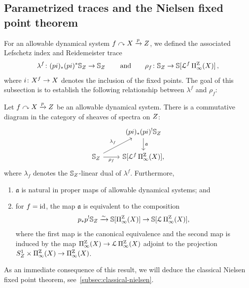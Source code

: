 \subsection{Parametrized traces and the Nielsen fixed point theorem}
For an allowable dynamical system $f\curvearrowright X\xrightarrow pZ$, we defined the associated Lefschetz index and Reidemeister trace
\begin{equation}
  \label{eq:nielsenthy-intro-characters}
  \lambda^f\colon (pi)_*(pi)^*\SS_\base\to \SS_\base\,
  \qquad\text{and}\qquad\rho_{f}\colon \SS_\base \to \SS [\cL^{f}\ani{\tset}[\base]]\,,
\end{equation}
where $i\colon X^f\to X$ denotes the inclusion of the fixed points.
The goal of this subsection is to establish the following relationship between $\lambda^f$ and $\rho_{f}$:
\begin{thm}\label{thm: lefschetz-nielsen}
  Let $f\curvearrowright X\xrightarrow pZ$ be an allowable dynamical system. There is a commutative diagram in the category of sheaves of spectra on $Z$:
  \[\begin{tikzcd}
      &  (pi)_*(pi)^!\SS_\base\\
      \SS_\base & {\SS [\cL^{f}\ani{\tset}[\base]]},
      \arrow["\mathfrak a", from=1-2, to=2-2]
      \arrow["{\lambda_f}", from=2-1, to=1-2]
      \arrow["{\rho_f}"', from=2-1, to=2-2]
    \end{tikzcd}\]
  where $\lambda_f$ denotes the $\mathbb{S}_Z$-linear dual of $\lambda^f$. Furthermore,
  \begin{enumerate}[label=(\roman*)]
  \item $\mathfrak a$ is natural in proper maps of allowable dynamical systems; and
  \item for $f = \operatorname{id}$, the map $\mathfrak a$ is equivalent to the composition
    \[
      p_*p^!\SS_\base\xrightarrow\sim\SS\lbrack \ani{\tset}[\base]\rbrack\to \SS\lbrack \cL \ani{\tset}[\base]\rbrack,
    \]
    where the first map is the canonical equivalence and the second map is induced by the map $\ani{\tset}[\base]\to \cL \ani{\tset}[\base]$ adjoint to the projection $S_\base^1\times \ani{\tset}[\base]\to \ani{\tset}[\base]$.
  \end{enumerate}
\end{thm}
As an immediate consequence of this result, we will deduce the classical Nielsen fixed point theorem, see~\cref{subsec:classical-nielsen}.

